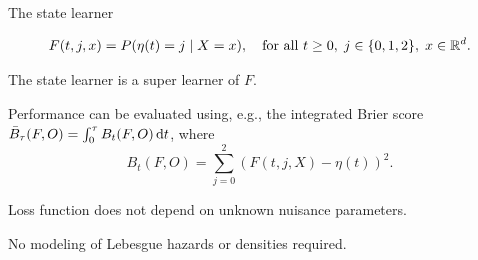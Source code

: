 \documentclass[smaller]{beamer}\usepackage{listings}
\begin{document}
\begin{frame}[label={sec:org4a9f98d}]{The state learner}
\small

\begin{equation*}
  F(t, j, x) = P(\eta(t) = j \mid X=x), \quad \text{for all } t \geq 0,\; j
  \in \{0, 1, 2\}, \; x \in \mathbb{R}^d.
\end{equation*}

\vfill

The state learner is a super learner of \(F\).

\vfill

Performance can be evaluated using, e.g., the integrated Brier score
\( \bar{B}_{\tau}(F, O) = \int_0^{\tau} B_t(F, O) \mathop{}\!\mathrm{d} t \), where
\begin{equation*}
  B_t(F, O) = \sum_{j=0}^{2} (F(t, j, X) - \eta(t))^2.
\end{equation*}

\vfill

Loss function does not depend on unknown nuisance parameters.

\vfill

No modeling of Lebesgue hazards or densities required.
\end{frame}
\end{document}
